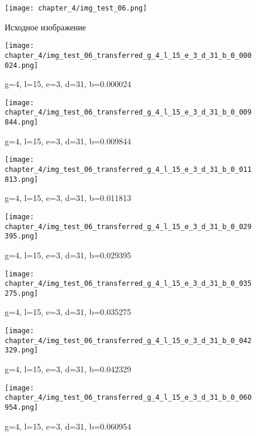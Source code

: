 \begin{figure}[h]
\begin{center}
\begin{minipage}[h]{0.4\linewidth}
\texttt{[image: chapter\_4/img\_test\_06.png]}
\caption{Исходное изображение} %
\label{img:experimoriginal} %
\end{minipage}
\hfill 
\begin{minipage}[h]{0.4\linewidth}
\texttt{[image: chapter\_4/img\_test\_06\_transferred\_g\_4\_l\_15\_e\_3\_d\_31\_b\_0\_000024.png]}
\caption{g=4, l=15, e=3, d=31, b=0.000024}
\label{img:experimcoded2}
\end{minipage}
\end{center}

\begin{center}
\begin{minipage}[h]{0.4\linewidth}
\texttt{[image: chapter\_4/img\_test\_06\_transferred\_g\_4\_l\_15\_e\_3\_d\_31\_b\_0\_009844.png]}
\caption{g=4, l=15, e=3, d=31, b=0.009844}
\label{img:experimcoded3}
\end{minipage}
\hfill 
\begin{minipage}[h]{0.4\linewidth}
\texttt{[image: chapter\_4/img\_test\_06\_transferred\_g\_4\_l\_15\_e\_3\_d\_31\_b\_0\_011813.png]}
\caption{g=4, l=15, e=3, d=31, b=0.011813}
\label{img:experimcoded4}
\end{minipage}
\end{center}
\end{figure}

\begin{figure}[h]
\begin{center}
\begin{minipage}[h]{0.4\linewidth}
\texttt{[image: chapter\_4/img\_test\_06\_transferred\_g\_4\_l\_15\_e\_3\_d\_31\_b\_0\_029395.png]}
\caption{g=4, l=15, e=3, d=31, b=0.029395}
\label{img:experimcoded9}
\end{minipage}
\hfill 
\begin{minipage}[h]{0.4\linewidth}
\texttt{[image: chapter\_4/img\_test\_06\_transferred\_g\_4\_l\_15\_e\_3\_d\_31\_b\_0\_035275.png]}
\caption{g=4, l=15, e=3, d=31, b=0.035275}
\label{img:experimcoded10}
\end{minipage}
\end{center}

\begin{center}
\begin{minipage}[h]{0.4\linewidth}
\texttt{[image: chapter\_4/img\_test\_06\_transferred\_g\_4\_l\_15\_e\_3\_d\_31\_b\_0\_042329.png]}
\caption{g=4, l=15, e=3, d=31, b=0.042329}
\label{img:experimcoded11}
\end{minipage}
\hfill 
\begin{minipage}[h]{0.4\linewidth}
\texttt{[image: chapter\_4/img\_test\_06\_transferred\_g\_4\_l\_15\_e\_3\_d\_31\_b\_0\_060954.png]}
\caption{g=4, l=15, e=3, d=31, b=0.060954}
\label{img:experimcoded12}
\end{minipage}
\end{center}
\end{figure}

